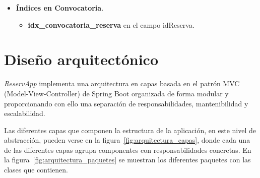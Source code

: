 \begin{itemize}
	\item \textbf{Índices en Convocatoria}.
	\begin{itemize}
       \item \textbf{idx\_convocatoria\_reserva} en el campo idReserva.
	\end{itemize}
\end{itemize}

\newpage

\section{Diseño arquitectónico}

\textit{ReservApp} implementa una arquitectura en capas basada en el patrón MVC (Model-View-Controller) de Spring Boot organizada de forma modular y proporcionando con ello una separación de responsabilidades, mantenibilidad y escalabilidad.

Las diferentes capas que componen la estructura de la aplicación, en este nivel de abstracción, pueden verse en la figura~\ref{fig:arquitectura_capas}, donde cada una de las diferentes capas agrupa componentes con responsabilidades concretas. En la figura~\ref{fig:arquitectura_paquetes} se muestran los diferentes paquetes con las clases que contienen.



